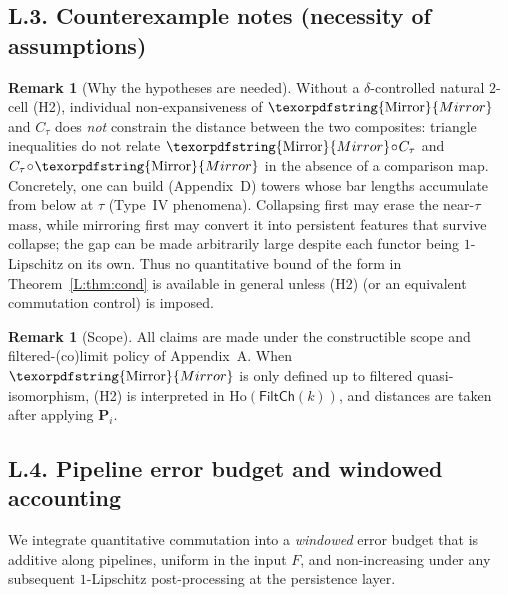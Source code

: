 \documentclass[11pt]{article}
\numberwithin{equation}{section}
\theoremstyle{plain}
\theoremstyle{definition}
\theoremstyle{remark}
\DeclareRobustCommand{\hyp}{\nobreakdash-}
\newcommand{\Ho}{\mathrm{Ho}}
\theoremstyle{plain}
\theoremstyle{definition}
\numberwithin{equation}{section}
\theoremstyle{definition}
\newtheorem{remark}[theorem]{Remark}
\DeclareRobustCommand{\Mirror}{\texorpdfstring{\ensuremath{\operatorname{Mirror}}}{Mirror}}
\numberwithin{equation}{section}
\theoremstyle{plain}
\theoremstyle{definition}
\theoremstyle{remark}
\begin{document}
\subsection*{L.3. Counterexample notes (necessity of assumptions)}
\begin{remark}[Why the hypotheses are needed]
Without a \(\delta\)-controlled natural \(2\)-cell (H2), individual non-expansiveness of \(\Mirror\) and \(C_\tau\) does \emph{not} constrain the distance between the two composites:
triangle inequalities do not relate \( \Mirror\!\circ\! C_\tau \) and \( C_\tau\!\circ\!\Mirror\) in the absence of a comparison map.
Concretely, one can build (Appendix~D) towers whose bar lengths accumulate from below at \(\tau\) (Type~IV phenomena).
Collapsing first may erase the near-\(\tau\) mass, while mirroring first may convert it into persistent features that survive collapse; the gap can be made arbitrarily large despite each functor being \(1\)-Lipschitz on its own.
Thus no quantitative bound of the form in Theorem~\ref{L:thm:cond} is available in general unless (H2) (or an equivalent commutation control) is imposed.
\end{remark}

\begin{remark}[Scope]
All claims are made under the constructible scope and filtered-(co)limit policy of Appendix~A.
When \(\Mirror\) is only defined up to filtered quasi-isomorphism, (H2) is interpreted in \(\Ho(\mathsf{FiltCh}(k))\), and distances are taken after applying \(\mathbf{P}_i\).
\end{remark}

\subsection*{L.4. Pipeline error budget and windowed accounting}
We integrate quantitative commutation into a \emph{windowed} error budget that is additive along pipelines, uniform in the input \(F\), and non-increasing under any subsequent \(1\)\hyp Lipschitz post\hyp processing at the persistence layer.
\end{document}

